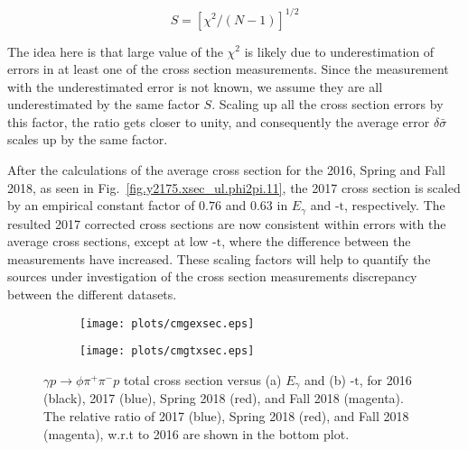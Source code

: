 \begin{equation}
    \label{eq.y2175.xsec_ul.phi2pi.4}
    S = [\chi^{2}/(N-1)]^{1/2}
\end{equation}

The idea here is that large value of the $\chi^{2}$ is likely due to underestimation of errors in at least one of the cross section measurements. Since the measurement with the underestimated error is not known, we assume they are all underestimated by the same factor $S$. Scaling up all the cross section errors by this factor, the ratio gets closer to unity, and consequently the average error $\delta\bar{\sigma}$ scales up by the same factor.
~\par After the calculations of the average cross section for the 2016, Spring and Fall 2018, as seen in Fig.~\ref{fig.y2175.xsec_ul.phi2pi.11}, the 2017 cross section is scaled by an empirical constant factor of $0.76$ and $0.63$ in $E_{\gamma}$ and $\mbox{-t}$, respectively. The resulted 2017 corrected cross sections are now consistent within errors with the average cross sections, except at low $\mbox{-t}$, where the difference between the measurements have increased. These scaling factors will help to quantify the sources under investigation of the cross section measurements discrepancy between the different datasets.

\begin{figure}[H]
    \centering
    \begin{subfigure}[b]{0.5\textwidth}
        \texttt{[image: plots/cmgexsec.eps]}
        \caption{}
        \label{fig.y2175.xsec_ul.phi2pi.10.a}
    \end{subfigure}\hfill
    \begin{subfigure}[b]{0.5\textwidth}
        \texttt{[image: plots/cmgtxsec.eps]}
        \caption{}
        \label{fig.y2175.xsec_ul.phi2pi.10.b}
    \end{subfigure}
    \caption{\label{fig.y2175.xsec_ul.phi2pi.10}$\gamma p \rightarrow \phi \pi^{+} \pi^{-} p$ total cross section versus (a) $E_{\gamma}$ and (b) $\mbox{-t}$, for 2016 (black), 2017 (blue), Spring 2018 (red), and Fall 2018 (magenta). The relative ratio of 2017 (blue), Spring 2018 (red), and Fall 2018 (magenta), w.r.t to 2016 are shown in the bottom plot.}
\end{figure}

